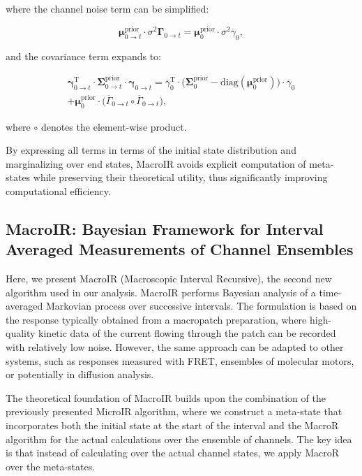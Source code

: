 \documentclass[pdflatex,sn-mathphys-num]{sn-jnl}%
\theoremstyle{thmstyleone}%
\theoremstyle{thmstyletwo}%
\theoremstyle{thmstylethree}%
\begin{document}
where the channel noise term can be simplified:

\begin{equation}
	\mathbf{\mu}^{\text{prior}}_{0 \rightarrow t} \cdot \sigma^2 \mathbf{\Gamma}_{0 \rightarrow t} = \mathbf{\mu}^{\text{prior}}_0 \cdot \sigma^2 \overline{\gamma}_0,
	\label{eq:meta_channel_noise}
\end{equation}

and the covariance term expands to:

\begin{multline}
	\mathbf{\gamma}_{0 \rightarrow t}^\mathrm{T} \cdot \mathbf{\Sigma}^{\text{prior}}_{0 \rightarrow t} \cdot \mathbf{\gamma}_{0 \rightarrow t} =
	\overline{\gamma}_0^\mathrm{T} \cdot \big( \mathbf{\Sigma}^{\text{prior}}_0 - \mathrm{diag}(\mathbf{\mu}^{\text{prior}}_0) \big) \cdot \overline{\gamma}_0 \\
	+ \mathbf{\mu}^{\text{prior}}_0 \cdot \big( \overline{\Gamma}_{0 \rightarrow t} \circ \overline{\Gamma}_{0 \rightarrow t} \big),
	\label{eq:meta_state_cov_mult_expanded}
\end{multline}

where \( \circ \) denotes the element-wise product.

By expressing all terms in terms of the initial state distribution and marginalizing over end states, MacroIR avoids explicit computation of meta-states while preserving their theoretical utility, thus significantly improving computational efficiency.


\subsection{MacroIR: Bayesian Framework for Interval Averaged Measurements of Channel Ensembles}

Here, we present MacroIR (Macroscopic Interval Recursive), the second new algorithm used in our analysis. MacroIR performs Bayesian analysis of a time-averaged Markovian process over successive intervals. The formulation is based on the response typically obtained from a macropatch preparation, where high-quality kinetic data of the current flowing through the patch can be recorded with relatively low noise. However, the same approach can be adapted to other systems, such as responses measured with FRET, ensembles of molecular motors, or potentially in diffusion analysis.

The theoretical foundation of MacroIR builds upon the combination of the previously presented MicroIR algorithm, where we construct a meta-state that incorporates both the initial state at the start of the interval and the MacroR algorithm for the actual calculations over the ensemble of channels. The key idea is that instead of calculating over the actual channel states, we apply MacroR over the meta-states.
\end{document}
